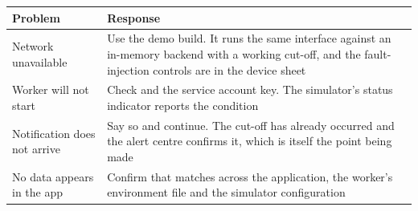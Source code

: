 \documentclass[11pt,a4paper]{article}
\begin{document}
\begin{table}[h]
\centering
\begin{tabular}{@{}L{4.4cm}L{10.2cm}@{}}
\toprule
\textbf{Problem} & \textbf{Response} \\
\midrule
Network unavailable & Use the demo build. It runs the same interface against an in-memory backend with a working cut-off, and the fault-injection controls are in the device sheet \\
Worker will not start & Check  and the service account key. The simulator's status indicator reports the condition \\
Notification does not arrive & Say so and continue. The cut-off has already occurred and the alert centre confirms it, which is itself the point being made \\
No data appears in the app & Confirm that  matches across the application, the worker's environment file and the simulator configuration \\
\bottomrule
\end{tabular}
\end{table}
\end{document}
